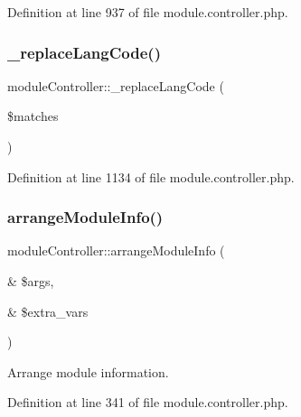 Definition at line 937 of file module.\+controller.\+php.

\hypertarget{classmoduleController_a0d4e5ad494cacf50288a3f6e9f013a5d}{}\label{classmoduleController_a0d4e5ad494cacf50288a3f6e9f013a5d} 
\subsubsection{\texorpdfstring{\+\_\+replace\+Lang\+Code()}{\_replaceLangCode()}}
{\footnotesize\ttfamily module\+Controller\+::\+\_\+replace\+Lang\+Code (\begin{DoxyParamCaption}\item[{}]{\$matches }\end{DoxyParamCaption})}



Definition at line 1134 of file module.\+controller.\+php.

\hypertarget{classmoduleController_a4c5f4174ead13e475ea863184bf657d6}{}\label{classmoduleController_a4c5f4174ead13e475ea863184bf657d6} 
\subsubsection{\texorpdfstring{arrange\+Module\+Info()}{arrangeModuleInfo()}}
{\footnotesize\ttfamily module\+Controller\+::arrange\+Module\+Info (\begin{DoxyParamCaption}\item[{\&}]{\$args,  }\item[{\&}]{\$extra\+\_\+vars }\end{DoxyParamCaption})}



Arrange module information. 



Definition at line 341 of file module.\+controller.\+php.

\hypertarget{classmoduleController_a2534f4a4108716e06d61eb984f700fdb}{}\label{classmoduleController_a2534f4a4108716e06d61eb984f700fdb} 
